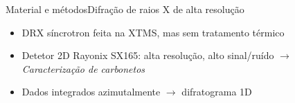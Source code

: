 \begin{frame}{Material e métodos}{Difração de raios X de alta resolução}
  \begin{itemize}
    \item DRX síncrotron feita na XTMS, mas sem tratamento térmico
    \item Detetor 2D Rayonix SX165: alta resolução, alto sinal/ruído $\rightarrow$ \emph{Caracterização de carbonetos}
    \item Dados integrados azimutalmente $\rightarrow$ difratograma 1D
  \end{itemize}

\end{frame}
